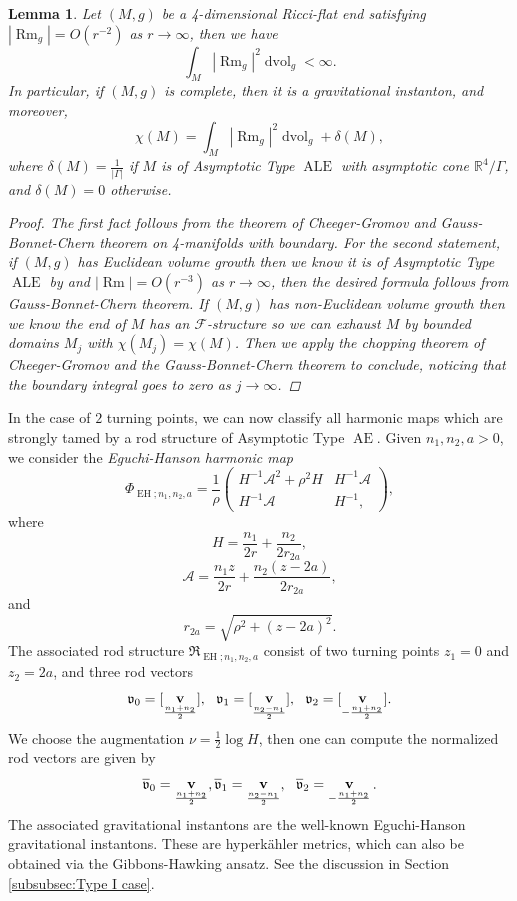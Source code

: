 \documentclass[a4paper,11pt]{amsart}
\newtheorem{lemma}[theorem]{Lemma}
\theoremstyle{definition}
\numberwithin{equation}{section}
\newcommand{\cA}{\mathcal A}
\newcommand{\R}{\mathbb{R}}
\newcommand{\mv} {\mathfrak v}
\newcommand{\mR} {\mathfrak R}
\DeclareMathOperator{\dvol}{dvol}
\DeclareMathOperator{\Rm}{Rm}
\DeclareMathOperator{\bv}{{\bf v}}
\DeclareMathOperator{\Ae}{AE}
\DeclareMathOperator{\ALe}{ALE}
\DeclareMathOperator{\EH}{EH}
\begin{document}
\begin{lemma}\label{lem:Gauss-Bonnet}
    Let $(M, g)$ be a 4-dimensional Ricci-flat end satisfying $|\Rm_g|=O(r^{-2})$ as $r\rightarrow\infty$, then we have 
    $$\int_M |\Rm_g|^2\dvol_g<\infty. $$In particular, if $(M, g)$ is complete, then it is a gravitational instanton, and moreover,
        \begin{equation}\chi(M)=
        \int_M |\Rm_g|^2\dvol_g+\delta(M),
        \end{equation}
        where $\delta(M)=\frac{1}{|\Gamma|}$ if $M$ is of Asymptotic Type $\ALe$ with asymptotic cone $\R^4/\Gamma$, and $\delta(M)=0$ otherwise.
    \begin{proof}
      The first fact  follows from the  theorem of Cheeger-Gromov and Gauss-Bonnet-Chern theorem on 4-manifolds with boundary. For the second statement,  if $(M, g)$ has Euclidean volume growth then we know it is of Asymptotic Type $\ALe$ by \cite{BKN} and  $|\Rm|=O(r^{-3})$ as $r\rightarrow\infty$, then the desired formula follows from Gauss-Bonnet-Chern theorem. If $(M,g)$ has non-Euclidean volume growth then we know the end of $M$ has an $\mathcal F$-structure so we can exhaust $M$ by bounded domains $M_j$ with $\chi(M_j)=\chi(M)$. Then we apply the  chopping theorem of Cheeger-Gromov and the Gauss-Bonnet-Chern theorem to conclude, noticing that the boundary integral goes to zero as $j\rightarrow\infty$.
    \end{proof}
\end{lemma}

In the case of $2$ turning points, we can now classify all harmonic maps which are strongly tamed by a rod structure of  Asymptotic Type  $\Ae$. 
  Given $n_1, n_2, a>0$, we consider the \emph{Eguchi-Hanson harmonic map}
\begin{equation}
	\Phi_{\EH;n_1, n_2, a}=\frac{1}{\rho}\left(\begin{matrix}
		H^{-1}\cA^2+\rho^2H & H^{-1} \cA \\
		H^{-1}\cA & H^{-1}, 
	\end{matrix}\right),
\end{equation}
where $$H=\frac{n_1}{2r}+\frac{n_2}{2r_{2a}},$$ $$\cA=\frac{n_1z}{2r}+\frac{n_2(z-2a)}{2r_{2a}},$$  and $$r_{2a}=\sqrt{\rho^2+(z-2a)^2}.$$  
The associated rod structure $\mR_{\EH; n_1, n_2, a}$ consist of two turning points $z_1=0$ and $z_2=2a$, and three rod vectors 
 $$\mv_0=[\bv_{\frac{n_1+n_2}{2}}], \ \ \mv_1=[\bv_{\frac{n_2-n_1}{2}}], \ \ \mv_2=[\bv_{-\frac{n_1+n_2}{2}}].$$
 We choose the augmentation  $\nu=\frac{1}{2}\log H$, then one can compute the normalized rod vectors are given by $$\overline{\mv}_0=\bv_{\frac{n_1+n_2}{2}}, \overline{\mv}_1=\bv_{\frac{n_2-n_1}{2}}, \ \ \overline{\mv}_2=\bv_{-\frac{n_1+n_2}{2}}.$$ The associated gravitational instantons are the well-known Eguchi-Hanson gravitational instantons. These are hyperk\"ahler metrics, which can also be obtained via the Gibbons-Hawking ansatz. See the discussion in Section \ref{subsubsec:Type I case}.
\end{document}
